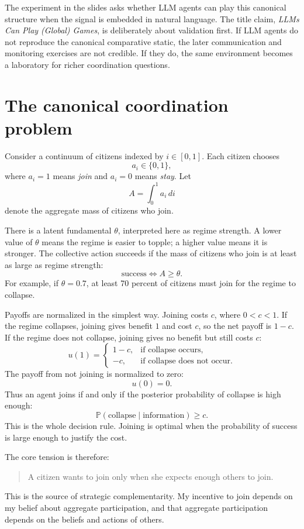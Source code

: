 \documentclass[11pt]{article}
\newcommand{\Prb}{\mathbb{P}}
\begin{document}
The experiment in the slides asks whether LLM agents can play this canonical structure when the signal is embedded in natural language. The title claim, \emph{LLMs Can Play (Global) Games}, is deliberately about validation first. If LLM agents do not reproduce the canonical comparative static, the later communication and monitoring exercises are not credible. If they do, the same environment becomes a laboratory for richer coordination questions.

\section{The canonical coordination problem}

Consider a continuum of citizens indexed by $i\in[0,1]$. Each citizen chooses
\[
  a_i\in\{0,1\},
\]
where $a_i=1$ means \emph{join} and $a_i=0$ means \emph{stay}. Let
\[
  A=\int_0^1 a_i\,di
\]
denote the aggregate mass of citizens who join.

There is a latent fundamental $\theta$, interpreted here as regime strength. A lower value of $\theta$ means the regime is easier to topple; a higher value means it is stronger. The collective action succeeds if the mass of citizens who join is at least as large as regime strength:
\[
  \text{success} \iff A\ge \theta.
\]
For example, if $\theta=0.7$, at least 70 percent of citizens must join for the regime to collapse.

Payoffs are normalized in the simplest way. Joining costs $c$, where $0<c<1$. If the regime collapses, joining gives benefit $1$ and cost $c$, so the net payoff is $1-c$. If the regime does not collapse, joining gives no benefit but still costs $c$:
\[
  u(1)=
  \begin{cases}
  1-c, & \text{if collapse occurs},\\
  -c, & \text{if collapse does not occur}.
  \end{cases}
\]
The payoff from not joining is normalized to zero:
\[
  u(0)=0.
\]
Thus an agent joins if and only if the posterior probability of collapse is high enough:
\[
  \Prb(\text{collapse}\mid\text{information})\ge c.
\]
This is the whole decision rule. Joining is optimal when the probability of success is large enough to justify the cost.

The core tension is therefore:
\begin{quote}
A citizen wants to join only when she expects enough others to join.
\end{quote}
This is the source of strategic complementarity. My incentive to join depends on my belief about aggregate participation, and that aggregate participation depends on the beliefs and actions of others.
\end{document}
